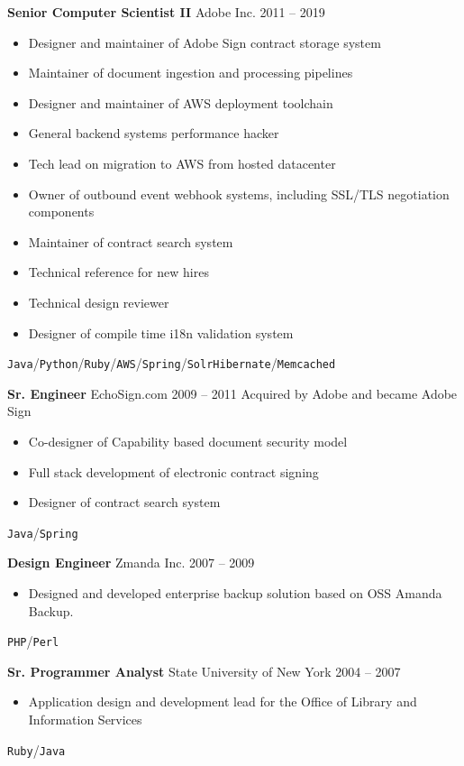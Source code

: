\documentclass{res}
\begin{document}
        {\bf Senior Computer Scientist II} \hfill Adobe Inc. \hfill 2011 -- 2019
        \begin{itemize}
        \item Designer and maintainer of Adobe Sign contract storage system
        \item Maintainer of document ingestion and processing pipelines
        \item Designer and maintainer of AWS deployment toolchain
        \item General backend systems performance hacker
        \item Tech lead on migration to AWS from hosted datacenter
        \item Owner of outbound event webhook systems, including SSL/TLS negotiation components
        \item Maintainer of contract search system
        \item Technical reference for new hires
        \item Technical design reviewer
        \item Designer of compile time i18n validation system
        \end{itemize}
	\texttt{Java}\slash\texttt{Python}\slash\texttt{Ruby}\slash\texttt{AWS}\slash\texttt{Spring}\slash\texttt{Solr}\texttt{Hibernate}\slash\texttt{Memcached}
        

        {\bf Sr. Engineer} \hfill EchoSign.com 2009 -- 2011
        Acquired by Adobe and became Adobe Sign
        \begin{itemize}
        \item Co-designer of Capability based document security model
        \item Full stack development of electronic contract signing
        \item Designer of contract search system
        \end{itemize}
	\texttt{Java}\slash\texttt{Spring}
        
        {\bf Design Engineer} \hfill Zmanda Inc. \hfill 2007 -- 2009
        \begin{itemize}
        \item Designed and developed enterprise backup solution based on OSS Amanda Backup.
        \end{itemize}
        \texttt{PHP}\slash\texttt{Perl}
        
        {\bf Sr. Programmer Analyst} \hfill State University of New York \hfill 2004 -- 2007
        \begin{itemize}
        \item Application design and development lead for the Office of Library and Information Services
        \end{itemize}
        \texttt{Ruby}\slash\texttt{Java}
          
\end{document}
